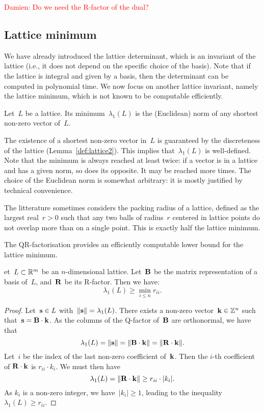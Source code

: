 \textcolor{red}{Damien: Do we need the R-factor of the dual?}




\subsection{Lattice minimum}

We have already introduced the lattice determinant, which is an invariant of the lattice (i.e., it does not depend on the 
specific choice of the basis). Note that if the lattice is integral and given by a basis, then the determinant can be computed 
in polynomial time. 
We now focus on another lattice invariant, namely the lattice minimum, which is not known to be computable efficiently.  

\begin{definition}
Let~$L$ be a lattice. Its minimum~$\lambda_1(L)$ is the (Euclidean) norm of any shortest non-zero vector of~$L$. 
\end{definition}

The existence of a shortest non-zero vector in~$L$ is guaranteed by the discreteness of the lattice (Lemma~\ref{def:lattice2}). 
This implies that~$\lambda_1(L)$ is well-defined. Note that the minimum is always reached at least twice: if a vector is in a lattice 
and has a given norm, so does its opposite. It may be reached more times. The choice of the Euclidean norm is somewhat arbitrary:
it is mostly justified by technical convenience.  

The litterature sometimes considers the packing radius of a lattice, defined as the largest real~$r>0$ such that any two balls of radius~$r$ centered in lattice points do not overlap more than on a single point. This is exactly half the lattice minimum.  

The QR-factorisation provides an efficiently computable lower bound for the lattice minimum. 

\begin{lemma}
\label{le:lambda_lower_bound}
et~$L \subset \mathbb{R}^m$ be an $n$-dimensional lattice. Let~${\bf B}$ be the matrix representation of a basis of~$L$, and~${\bf R}$ 
be its R-factor. Then we have:
\[ \lambda_1(L) \geq  \min_{i \leq n} r_{ii}.\]
\end{lemma}

\begin{proof}
Let~${\bf s} \in L$ with~$\|{\bf s}\| = \lambda_1(L)$. 
There exists a non-zero  vector~${\bf k} \in \mathbb{Z}^n$ such that~${\bf s} = {\bf B} \cdot {\bf k}$. 
As the columns of the Q-factor of~${\bf B}$ are orthonormal, we have that
\[
\lambda_1(L) = \|{\bf s}\| = \|{\bf B} \cdot {\bf k}\| = \|{\bf R} \cdot {\bf k}\|. 
\]
Let~$i$ be the index of the last non-zero coefficient of~${\bf k}$. Then the $i$-th coefficient of  ${\bf R} \cdot {\bf k}$ 
is $r_{ii} \cdot k_i$. We must then have
\[
\lambda_1(L) = \|{\bf R} \cdot {\bf k}\| \geq r_{ii} \cdot |k_i|.
\]
As $k_i$ is a non-zero integer, we have~$|k_i| \geq 1$, leading to the inequality~$\lambda_1(L) \geq r_{ii}$.
\end{proof}



